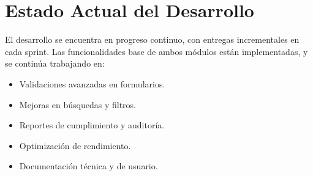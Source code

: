 \section{Estado Actual del Desarrollo}

El desarrollo se encuentra en progreso continuo, con entregas incrementales en cada sprint. Las funcionalidades base de ambos módulos están implementadas, y se continúa trabajando en:

\begin{itemize}
    \item Validaciones avanzadas en formularios.
    \item Mejoras en búsquedas y filtros.
    \item Reportes de cumplimiento y auditoría.
    \item Optimización de rendimiento.
    \item Documentación técnica y de usuario.
\end{itemize}

